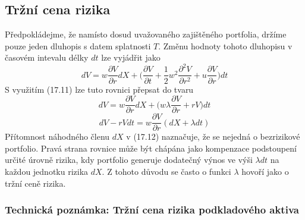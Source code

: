 \documentclass[a4paper]{book}
\begin{document}
\subsection{Tržní cena rizika}

Předpokládejme, že namísto dosud uvažovaného zajištěného portfolia, držíme pouze jeden dluhopis s datem splatnosti $T$. Změnu hodnoty tohoto dluhopisu v časovém intevalu délky $dt$ lze vyjádřit jako
\begin{equation*}
dV = w \frac{\partial V}{\partial r}dX + \Bigg( \frac{\partial V}{\partial t} + \frac{1}{2}w^2\frac{\partial^2 V}{\partial r^2} + u \frac{\partial V}{\partial r} \Bigg)dt
\end{equation*}
S využitím (17.11) lze tuto rovnici přepsat do tvaru
\begin{equation*}
dV = w \frac{\partial V}{\partial r}dX + \Bigg( w \lambda \frac{\partial V}{\partial r} + rV \Bigg)dt
\end{equation*}
\begin{equation}
dV - rVdt = w \frac{\partial V}{\partial r}(dX + \lambda dt)
\end{equation}
Přítomnost náhodného členu $dX$ v (17.12) naznačuje, že se nejedná o bezrizikové portfolio. Pravá strana rovnice může být chápána jako kompenzace podstoupení určité úrovně rizika, kdy portfolio generuje dodatečný výnos ve výši $\lambda dt$ na každou jednotku rizika $dX$. Z tohoto důvodu se často o funkci $\lambda$ hovoří jako o tržní ceně rizika.

\subsubsection{Technická poznámka: Tržní cena rizika podkladového aktiva}
\end{document}
